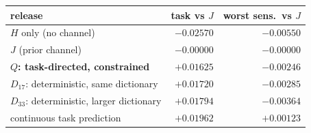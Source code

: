 \begin{tabular}{@{}l r r@{}}
\toprule
release & task vs $J$ & worst sens.\ vs $J$ \\
\midrule
$H$ only (no channel) & $-0.02570$ & $-0.00550$ \\
$J$ (prior channel) & $-0.00000$ & $-0.00000$ \\
\textbf{$Q$: task-directed, constrained} & $+0.01625$ & $-0.00246$ \\
$D_{17}$: deterministic, same dictionary & $+0.01720$ & $-0.00285$ \\
$D_{33}$: deterministic, larger dictionary & $+0.01794$ & $-0.00364$ \\
continuous task prediction & $+0.01962$ & $+0.00123$ \\
\bottomrule
\end{tabular}
